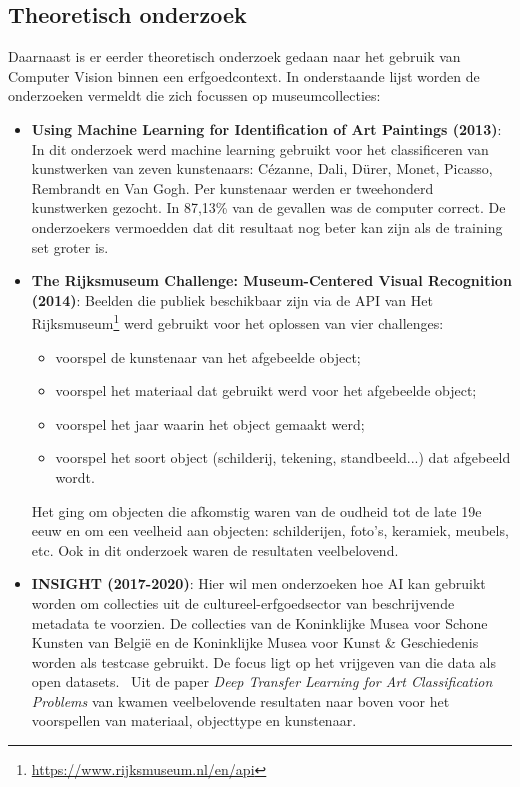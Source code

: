 \documentclass[fleqn,10pt]{voorstel}
\begin{document}
\subsection{Theoretisch onderzoek}
Daarnaast is er eerder theoretisch onderzoek gedaan naar het gebruik van Computer Vision binnen een erfgoedcontext. In onderstaande lijst worden de onderzoeken vermeldt die zich focussen op museumcollecties:
\begin{itemize}
	\item \textbf{Using Machine Learning for Identification of Art Paintings (2013)}: In dit onderzoek werd machine learning gebruikt voor het classificeren van kunstwerken van zeven kunstenaars: C\'{e}zanne, Dali, D\"{u}rer, Monet, Picasso, Rembrandt en Van Gogh. Per kunstenaar werden er tweehonderd kunstwerken gezocht. In 87,13\% van de gevallen was de computer correct. De onderzoekers vermoedden dat dit resultaat nog beter kan zijn als de training set groter is.~\autocite{Blessings2013}
	
	\item \textbf{The Rijksmuseum Challenge: Museum-Centered Visual Recognition (2014)}: Beelden die publiek beschikbaar zijn via de API van Het Rijksmuseum\footnote{\url{https://www.rijksmuseum.nl/en/api}} werd gebruikt voor het oplossen van vier challenges: 
	\begin{itemize}
		\item voorspel de kunstenaar van het afgebeelde object;
		\item voorspel het materiaal dat gebruikt werd voor het afgebeelde object;
		\item voorspel het jaar waarin het object gemaakt werd;
		\item voorspel het soort object (schilderij, tekening, standbeeld...) dat afgebeeld wordt.
	\end{itemize}
	Het ging om objecten die afkomstig waren van de oudheid tot de late 19e eeuw en om een veelheid aan objecten: schilderijen, foto's, keramiek, meubels, etc. Ook in dit onderzoek waren de resultaten veelbelovend.~\autocite{Mensink2014}
	
	\item \textbf{INSIGHT (2017-2020)}: Hier wil men onderzoeken hoe AI kan gebruikt worden om collecties uit de cultureel-erfgoedsector van beschrijvende metadata te voorzien. De collecties van de Koninklijke Musea voor Schone Kunsten van België en de Koninklijke Musea voor Kunst \& Geschiedenis worden als testcase gebruikt. De focus ligt op het vrijgeven van die data als open datasets.~\autocite{UniAntwerpen2017?} Uit de paper \emph{Deep Transfer Learning for Art Classification Problems} van \textcite{Sabatelli2018} kwamen veelbelovende resultaten naar boven voor het voorspellen van materiaal, objecttype en kunstenaar.
	

\end{itemize}
\end{document}
